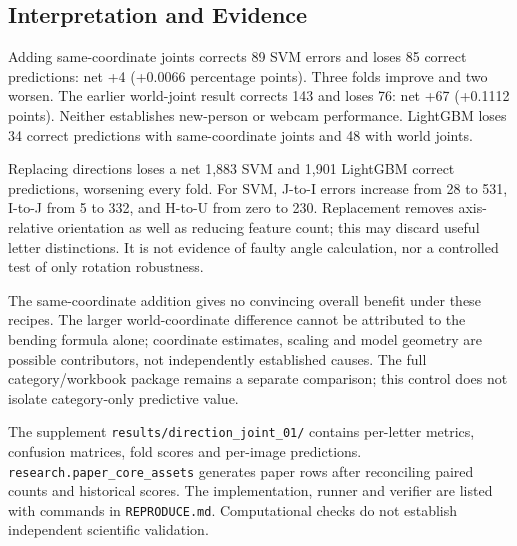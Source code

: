 \subsection{Interpretation and Evidence}
Adding same-coordinate joints corrects 89 SVM errors and loses 85 correct predictions: net +4 (+0.0066 percentage points). Three folds improve and two worsen. The earlier world-joint result corrects 143 and loses 76: net +67 (+0.1112 points). Neither establishes new-person or webcam performance. LightGBM loses 34 correct predictions with same-coordinate joints and 48 with world joints.

Replacing directions loses a net 1,883 SVM and 1,901 LightGBM correct predictions, worsening every fold. For SVM, J-to-I errors increase from 28 to 531, I-to-J from 5 to 332, and H-to-U from zero to 230. Replacement removes axis-relative orientation as well as reducing feature count; this may discard useful letter distinctions. It is not evidence of faulty angle calculation, nor a controlled test of only rotation robustness.

The same-coordinate addition gives no convincing overall benefit under these recipes. The larger world-coordinate difference cannot be attributed to the bending formula alone; coordinate estimates, scaling and model geometry are possible contributors, not independently established causes. The full category/workbook package remains a separate comparison; this control does not isolate category-only predictive value.

The supplement \texttt{results/direction\_joint\_01/} contains per-letter metrics, confusion matrices, fold scores and per-image predictions. \texttt{research.paper\_core\_assets} generates paper rows after reconciling paired counts and historical scores. The implementation, runner and verifier are listed with commands in \texttt{REPRODUCE.md}. Computational checks do not establish independent scientific validation.
